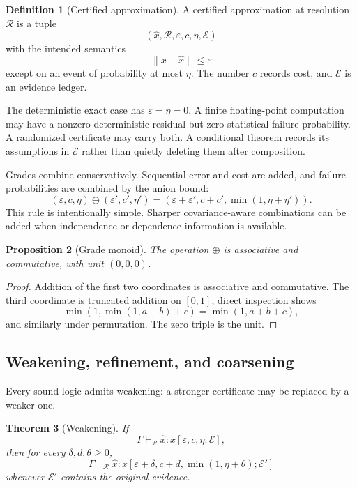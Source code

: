 \documentclass[11pt]{article}
\newtheorem{theorem}{Theorem}[section]
\newtheorem{proposition}[theorem]{Proposition}
\theoremstyle{definition}
\newtheorem{definition}[theorem]{Definition}
\theoremstyle{remark}
\begin{document}
\begin{definition}[Certified approximation]
A certified approximation at resolution $\mathcal R$ is a tuple
\[
   (\widehat x,\mathcal R,\varepsilon,c,\eta,\mathcal E)
\]
with the intended semantics
\[
   \|x-\widehat x\|\le\varepsilon
\]
except on an event of probability at most $\eta$.  The number $c$ records cost, and $\mathcal E$ is an evidence ledger.
\end{definition}

The deterministic exact case has $\varepsilon=\eta=0$.  A finite floating-point computation may have a nonzero deterministic residual but zero statistical failure probability.  A randomized certificate may carry both.  A conditional theorem records its assumptions in $\mathcal E$ rather than quietly deleting them after composition.

Grades combine conservatively.  Sequential error and cost are added, and failure probabilities are combined by the union bound:
\[
   (\varepsilon,c,\eta)
   \oplus
   (\varepsilon',c',\eta')
   =
   (\varepsilon+\varepsilon',c+c',\min(1,\eta+\eta')).
\]
This rule is intentionally simple.  Sharper covariance-aware combinations can be added when independence or dependence information is available.

\begin{proposition}[Grade monoid]
The operation $\oplus$ is associative and commutative, with unit $(0,0,0)$.
\end{proposition}

\begin{proof}
Addition of the first two coordinates is associative and commutative.  The third coordinate is truncated addition on $[0,1]$; direct inspection shows
\[
   \min(1,\min(1,a+b)+c)
   =
   \min(1,a+b+c),
\]
and similarly under permutation.  The zero triple is the unit.
\end{proof}

\subsection{Weakening, refinement, and coarsening}

Every sound logic admits weakening: a stronger certificate may be replaced by a weaker one.

\begin{theorem}[Weakening]
If
\[
   \Gamma\vdash_{\mathcal R}\widehat x:x[\varepsilon,c,\eta;\mathcal E],
\]
then for every $\delta,d,\theta\ge0$,
\[
   \Gamma\vdash_{\mathcal R}\widehat x:x
   [\varepsilon+\delta,c+d,\min(1,\eta+\theta);\mathcal E']
\]
whenever $\mathcal E'$ contains the original evidence.
\end{theorem}
\end{document}
